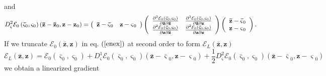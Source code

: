 \documentclass[aps,preprint]{revtex4}%
\begin{document}
and
\begin{equation}
D_{\mathbf{\varsigma}}^{2}\mathcal{E}_{0}\left(  \mathbf{\bar{\varsigma}}%
_{0},\mathbf{\varsigma}_{0}\right)  \left(  \mathbf{\bar{z}-\bar{z}}%
_{0},\mathbf{z-z}_{0}\right)  =\left(
\begin{array}
[c]{cc}%
\mathbf{\bar{z}-\bar{\varsigma}}_{0} & \mathbf{z-\varsigma}_{0}%
\end{array}
\right)  \left(
\begin{array}
[c]{cc}%
\frac{\partial^{2}\mathcal{E}_{0}\left(  \mathbf{\bar{\varsigma}}%
_{0},\mathbf{\varsigma}_{0}\right)  }{\partial\mathbf{\bar{z}}\partial
\mathbf{\bar{z}}} & \frac{\partial^{2}\mathcal{E}_{0}\left(  \mathbf{\bar
{\varsigma}}_{0},\mathbf{\varsigma}_{0}\right)  }{\partial\mathbf{\bar{z}%
}\partial\mathbf{z}}\\
\frac{\partial^{2}\mathcal{E}_{0}\left(  \mathbf{\bar{\varsigma}}%
_{0},\mathbf{\varsigma}_{0}\right)  }{\partial\mathbf{z}\partial
\mathbf{\bar{z}}} & \frac{\partial^{2}\mathcal{E}_{0}\left(  \mathbf{\bar
{\varsigma}}_{0},\mathbf{\varsigma}_{0}\right)  }{\partial\mathbf{z}%
\partial\mathbf{z}}%
\end{array}
\right)  \left(
\begin{array}
[c]{c}%
\mathbf{\bar{z}-\bar{\varsigma}}_{0}\\
\mathbf{z-\varsigma}_{0}%
\end{array}
\right)  .
\end{equation}
If we truncate $\mathcal{E}_{0}\left(  \mathbf{\bar{z}},\mathbf{z}\right)  $
in eq. $\left(  \ref{enex}\right)  $ at second order to form $\mathcal{E}%
_{L}\left(  \mathbf{\bar{z}},\mathbf{z}\right)  $
\begin{equation}
\mathcal{E}_{L}\left(  \mathbf{\bar{z}},\mathbf{z}\right)  =\mathcal{E}%
_{0}\left(  \mathbf{\bar{\varsigma}}_{0},\mathbf{\varsigma}_{0}\right)
+D_{\mathbf{\varsigma}}^{1}\mathcal{E}_{0}\left(  \mathbf{\bar{\varsigma}}%
_{0},\mathbf{\varsigma}_{0}\right)  \left(  \mathbf{\bar{z}-\bar{\varsigma}%
}_{0},\mathbf{z-\varsigma}_{0}\right)  +\frac{1}{2}D_{\mathbf{\varsigma}}%
^{2}\mathcal{E}_{0}\left(  \mathbf{\bar{\varsigma}}_{0},\mathbf{\varsigma}%
_{0}\right)  \left(  \mathbf{\bar{z}-\bar{\varsigma}}_{0},\mathbf{z-\varsigma
}_{0}\right)
\end{equation}
we obtain a linearized gradient
\end{document}
